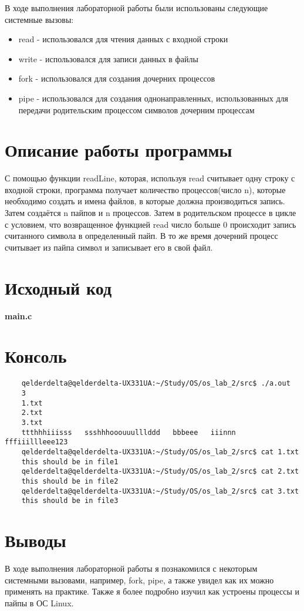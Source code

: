\documentclass[a4paper, 12pt]{article}
\begin{document}
В ходе выполнения лабораторной работы были использованы следующие системные вызовы:

\begin{itemize}
	\item read - использовался для чтения данных с входной строки
	\item write - использовался для записи данных в файлы
	\item fork - использовался для создания дочерних процессов
	\item pipe - использовался для создания однонаправленных, использованных для передачи родительским процессом символов дочерним процессам
\end{itemize}
\section{Описание работы программы}

С помощью функции readLine, которая, используя read считывает одну строку с входной строки, программа получает количество процессов(число n), которые необходимо создать и имена файлов, в которые должна производиться запись. Затем создаётся n пайпов и n процессов. Затем в родительском процессе в цикле с условием, что возвращенное функцией read число больше 0 происходит запись считанного символа в определенный пайп. В то же время дочерний процесс считывает из пайпа символ и записывает его в свой файл.

\newpage

\section{Исходный код}

\textbf{\large{main.c}}

\newpage
\section{Консоль}

\begin{verbatim}
	qelderdelta@qelderdelta-UX331UA:~/Study/OS/os_lab_2/src$ ./a.out
	3
	1.txt
	2.txt
	3.txt
	ttthhhiiisss   ssshhhooouuulllddd   bbbeee   iiinnn   fffiiillleee123                            
	qelderdelta@qelderdelta-UX331UA:~/Study/OS/os_lab_2/src$ cat 1.txt
	this should be in file1
	qelderdelta@qelderdelta-UX331UA:~/Study/OS/os_lab_2/src$ cat 2.txt
	this should be in file2
	qelderdelta@qelderdelta-UX331UA:~/Study/OS/os_lab_2/src$ cat 3.txt
	this should be in file3
\end{verbatim}
\newpage
\section{Выводы}

В ходе выполнения лабораторной работы я познакомился с некоторым системными вызовами, например, fork, pipe, а также увидел как их можно применять на практике. Также я более подробно изучил как устроены процессы и пайпы в ОС Linux.
\end{document}
